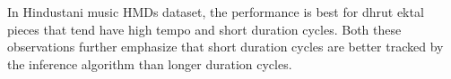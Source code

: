 In Hindustani music \acrshort{HMDs} dataset, the performance is best for \gls{dhrut} \gls{ektal} pieces that tend have high tempo and short duration cycles. Both these observations further emphasize that short duration cycles are better tracked by the inference algorithm than longer duration cycles. %
%
